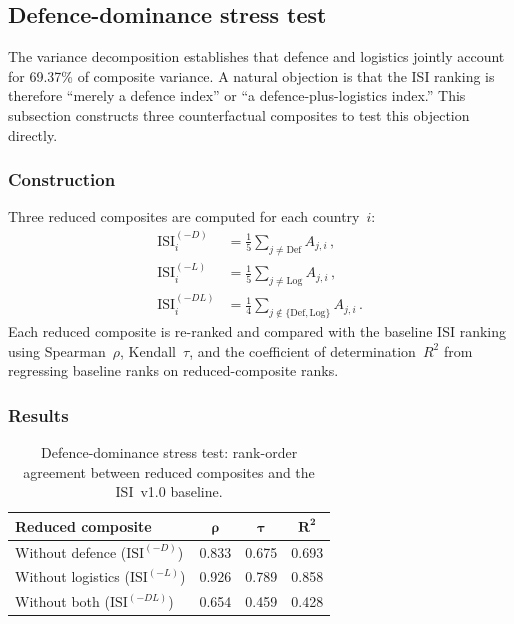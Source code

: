 \subsection{Defence-dominance stress test}\label{sec:defence-stress-test}

The variance decomposition establishes that defence and logistics
jointly account for 69.37\% of composite variance.  A natural
objection is that the ISI ranking is therefore ``merely a defence
index'' or ``a defence-plus-logistics index.''  This subsection
constructs three counterfactual composites to test this objection
directly.

\subsubsection{Construction}

Three reduced composites are computed for each country~$i$:
\begin{align}
  \text{ISI}_i^{(-D)}
    &= \frac{1}{5}\sum_{j \neq \text{Def}} A_{j,i}\,,
    \label{eq:isi-no-defence} \\
  \text{ISI}_i^{(-L)}
    &= \frac{1}{5}\sum_{j \neq \text{Log}} A_{j,i}\,,
    \label{eq:isi-no-logistics} \\
  \text{ISI}_i^{(-DL)}
    &= \frac{1}{4}\sum_{j \notin \{\text{Def},\text{Log}\}} A_{j,i}\,.
    \label{eq:isi-no-defence-logistics}
\end{align}
Each reduced composite is re-ranked and compared with the baseline
ISI ranking using Spearman~$\rho$, Kendall~$\tau$, and the
coefficient of determination~$R^2$ from regressing baseline ranks
on reduced-composite ranks.

\subsubsection{Results}

\begin{table}[htbp]
\centering
\caption{Defence-dominance stress test: rank-order agreement between
  reduced composites and the ISI~v1.0 baseline.}
\label{tab:defence-stress-test}
\small
\setlength{\tabcolsep}{4pt}
\begin{tabular*}{\textwidth}{@{\extracolsep{\fill}} l S[table-format=1.3,round-precision=3] S[table-format=1.3,round-precision=3] S[table-format=1.3,round-precision=3] @{}}
\toprule
\textbf{Reduced composite}
  & {$\boldsymbol{\rho}$} & {$\boldsymbol{\tau}$}
  & {$\boldsymbol{R^2}$} \\
\midrule
Without defence ($\text{ISI}^{(-D)}$)
  & 0.833 & 0.675 & 0.693 \\
Without logistics ($\text{ISI}^{(-L)}$)
  & 0.926 & 0.789 & 0.858 \\
Without both ($\text{ISI}^{(-DL)}$)
  & 0.654 & 0.459 & 0.428 \\
\bottomrule
\end{tabular*}
\end{table}


